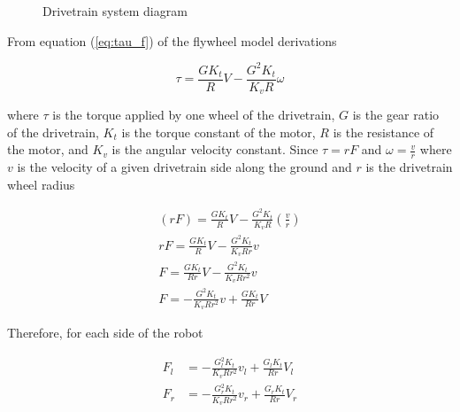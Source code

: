 \begin{figure}[H]

  \caption{Drivetrain system diagram}
  \label{fig:drivetrain}
\end{figure}

From equation (\ref{eq:tau_f}) of the flywheel model derivations

\begin{equation}
  \tau = \frac{GK_t}{R} V - \frac{G^2K_t}{K_v R} \omega
    \label{eq:drivetrain_tau}
\end{equation}

where $\tau$ is the torque applied by one wheel of the drivetrain, $G$ is the
gear ratio of the drivetrain, $K_t$ is the torque constant of the motor, $R$ is
the resistance of the motor, and $K_v$ is the angular velocity constant. Since
$\tau = rF$ and $\omega = \frac{v}{r}$ where $v$ is the velocity of a given
drivetrain side along the ground and $r$ is the drivetrain wheel radius

\begin{align*}
  (rF) = \frac{GK_t}{R} V - \frac{G^2K_t}{K_v R} \left(\frac{v}{r}\right) \\
  rF = \frac{GK_t}{R} V - \frac{G^2K_t}{K_v Rr} v \\
  F = \frac{GK_t}{Rr} V - \frac{G^2K_t}{K_v Rr^2} v \\
  F = -\frac{G^2K_t}{K_v Rr^2} v + \frac{GK_t}{Rr} V
\end{align*}

Therefore, for each side of the robot

\begin{align*}
  F_l &= -\frac{G_l^2 K_t}{K_v R r^2} v_l + \frac{G_l K_t}{Rr} V_l \\
  F_r &= -\frac{G_r^2 K_t}{K_v R r^2} v_r + \frac{G_r K_t}{Rr} V_r
\end{align*}

